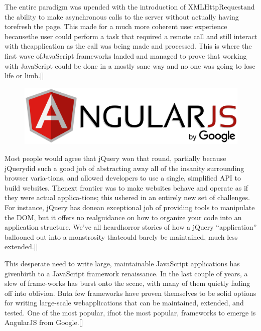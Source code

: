 The  entire  paradigm  was  upended  with  the  introduction  of  XMLHttpRequestand the ability to make asynchronous calls to the server without actually having torefresh  the  page. This  made  for  a  much  more  coherent  user  experience  becausethe user could perform a task that required a remote call and still interact with theapplication as the call was being made and processed. This is where the first wave ofJavaScript frameworks landed and managed to prove that working with JavaScript could be done in a mostly sane way and no one was going to lose life or limb.[\cite{1}]  
\newline
\begin{figure}[h]
		\centering
		\includegraphics[width=0.7\linewidth]{images/angular}
		\label{fig:angular-logo}
\end{figure}
Most  people  would  agree  that  jQuery  won  that  round,  partially  because  jQuerydid such a good job of abstracting away all of the insanity surrounding browser varia-tions,  and  allowed  developers  to  use  a  single,  simplified  API  to  build  websites.  Thenext frontier was to make websites behave and operate as if they were actual applica-tions; this ushered in an entirely new set of challenges. For instance, jQuery has donean  exceptional  job  of  providing  tools  to  manipulate  the  DOM,  but  it  offers  no  realguidance on how to organize your code into an application structure. We’ve all heardhorror  stories  of  how  a  jQuery  “application”  ballooned  out  into  a  monstrosity  thatcould barely be maintained, much less extended.[\cite{1}]  
\newline

This desperate need to write large, maintainable JavaScript applications has givenbirth to a JavaScript framework renaissance. In the last couple of years, a slew of frame-works has burst onto the scene, with many of them quietly fading off into oblivion. Buta few frameworks have proven themselves to be solid options for writing large-scale webapplications that can be maintained, extended, and tested. One of the most popular, ifnot the most popular, frameworks to emerge is AngularJS from Google.[\cite{1}]  
\newline

